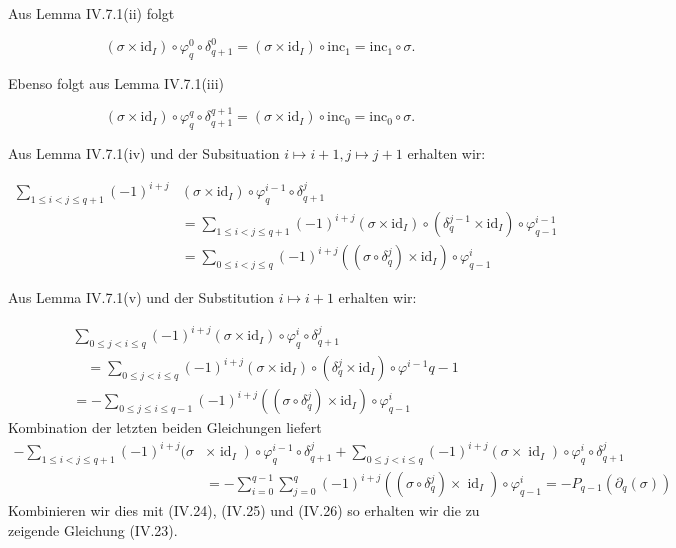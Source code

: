 \documentclass[10pt, letterpaper]{article}
\begin{document}
Aus Lemma IV.7.1(ii) folgt

$$
\left(\sigma \times \mathrm{id}_I\right) \circ \varphi_q^0 \circ \delta_{q+1}^0=\left(\sigma \times \mathrm{id}_I\right) \circ \mathrm{inc}_1=\mathrm{inc}_1 \circ \sigma .
$$

Ebenso folgt aus Lemma IV.7.1(iii)

$$
\left(\sigma \times \mathrm{id}_I\right) \circ \varphi_q^q \circ \delta_{q+1}^{q+1}=\left(\sigma \times \mathrm{id}_I\right) \circ \mathrm{inc}_0=\mathrm{inc}_0 \circ \sigma .
$$


Aus Lemma IV.7.1(iv) und der Subsituation $i \mapsto i+1, j \mapsto j+1$ erhalten wir:

$$
\begin{aligned}
\sum_{1 \leq i<j \leq q+1}(-1)^{i+j} & \left(\sigma \times \mathrm{id}_I\right) \circ \varphi_q^{i-1} \circ \delta_{q+1}^j \\
& =\sum_{1 \leq i<j \leq q+1}(-1)^{i+j}\left(\sigma \times \mathrm{id}_I\right) \circ\left(\delta_q^{j-1} \times \mathrm{id}_I\right) \circ \varphi_{q-1}^{i-1} \\
& =\sum_{0 \leq i<j \leq q}(-1)^{i+j}\left(\left(\sigma \circ \delta_q^j\right) \times \mathrm{id}_I\right) \circ \varphi_{q-1}^i
\end{aligned}
$$

Aus Lemma IV.7.1(v) und der Substitution $i \mapsto i+1$ erhalten wir:

$$
\begin{aligned}
& \sum_{0 \leq j<i \leq q}(-1)^{i+j}\left(\sigma \times \mathrm{id}_I\right) \circ \varphi_q^i \circ \delta_{q+1}^j \\
& \quad=\sum_{0 \leq j<i \leq q}(-1)^{i+j}\left(\sigma \times \mathrm{id}_I\right) \circ\left(\delta_q^j \times \mathrm{id}_I\right) \circ \varphi^{i-1} q-1 \\
&=-\sum_{0 \leq j \leq i \leq q-1}(-1)^{i+j}\left(\left(\sigma \circ \delta_q^j\right) \times \mathrm{id}_I\right) \circ \varphi_{q-1}^i
\end{aligned}
$$
Kombination der letzten beiden Gleichungen liefert
$$
\begin{aligned}
-\sum_{1 \leq i<j \leq q+1}(-1)^{i+j}(\sigma & \left.\times \operatorname{id}_I\right) \circ \varphi_q^{i-1} \circ \delta_{q+1}^j+\sum_{0 \leq j<i \leq q}(-1)^{i+j}\left(\sigma \times \operatorname{id}_I\right) \circ \varphi_q^i \circ \delta_{q+1}^j \\
& =-\sum_{i=0}^{q-1} \sum_{j=0}^q(-1)^{i+j}\left(\left(\sigma \circ \delta_q^j\right) \times \operatorname{id}_I\right) \circ \varphi_{q-1}^i=-P_{q-1}\left(\partial_q(\sigma)\right)
\end{aligned}
$$
Kombinieren wir dies mit (IV.24), (IV.25) und (IV.26) so erhalten wir die zu zeigende Gleichung (IV.23).
\end{document}

